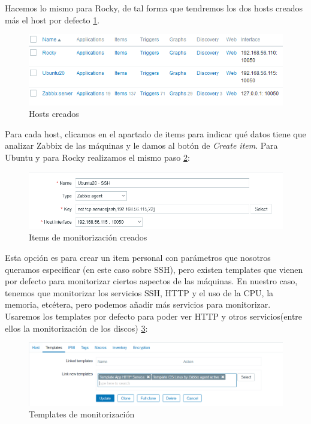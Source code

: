 Hacemos lo mismo para Rocky, de tal forma que tendremos los dos hosts creados más el host por defecto \ref{fig:host-creados}.

\begin{figure}[H]
  \centering
  \includegraphics[scale=0.8]{Captura15}
  \caption{Hosts creados}
  \label{fig:host-creados}
\end{figure}

Para cada host, clicamos en el apartado de items para indicar qué datos tiene que analizar Zabbix de las máquinas y le damos al botón de \textit{Create item}. Para Ubuntu y para Rocky realizamos el mismo paso \ref{fig:items-creados}:

\begin{figure}[H]
  \centering
  \includegraphics[scale=0.9]{Captura16}
  \caption{Items de monitorización creados}
  \label{fig:items-creados}
\end{figure}

Esta opción es para crear un item personal con parámetros que nosotros queramos especificar (en este caso sobre SSH), pero existen templates que vienen por defecto para monitorizar ciertos aspectos de las máquinas. En nuestro caso, tenemos que monitorizar los servicios SSH, HTTP y el uso de la CPU, la memoria, etcétera, pero podemos añadir más servicios para monitorizar. Usaremos los templates por defecto para poder ver HTTP y otros servicios(entre ellos la monitorización de los discos) \ref{fig:templates}:

\begin{figure}[H]
  \centering
  \includegraphics[scale=0.6]{Captura17}
  \caption{Templates de monitorización}
  \label{fig:templates}
\end{figure}

